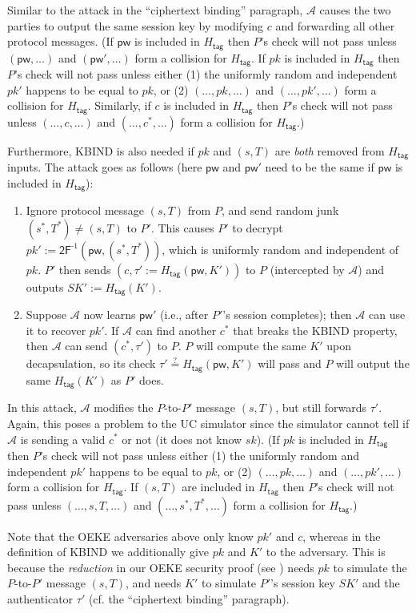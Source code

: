 \documentclass{article}
\theoremstyle{plain}
\theoremstyle{definition}
\theoremstyle{remark}
\newcommand{\adv}{\mathcal{A}}
\newcommand{\Htag}{H_\mathsf{tag}}
\newcommand{\pw}{\mathsf{pw}}
\begin{document}
Similar to the attack in the ``ciphertext binding'' paragraph, $\adv$ causes the two parties to output the same session key by modifying $c$ and forwarding all other protocol messages. (If $\pw$ is included in $\Htag$ then $P$'s check will not pass unless $(\pw, \dots)$ and $(\pw', \dots)$ form a collision for $\Htag$. If $pk$ is included in $\Htag$ then $P$'s check will not pass unless either (1) the uniformly random and independent $pk'$ happens to be equal to $pk$, or (2) $(\dots, pk, \dots)$ and $(\dots, pk', \dots)$ form a collision for $\Htag$. Similarly, if $c$ is included in $\Htag$ then $P$'s check will not pass unless $(\dots, c, \dots)$ and $(\dots, c^*, \dots)$ form a collision for $\Htag$.)

Furthermore, KBIND is also needed if $pk$ and $(s,T)$ are \emph{both} removed from $\Htag$ inputs. The attack goes as follows (here $\pw$ and $\pw'$ need to be the same if $\pw$ is included in $\Htag$):
\begin{enumerate}
  \item Ignore protocol message $(s,T)$ from $P$, and send random junk $(s^*,T^*) \neq (s,T)$ to $P'$. This causes $P'$ to decrypt $pk' := \mathsf{2F}^{\text{-}1}(\pw,(s^*,T^*))$, which is uniformly random and independent of $pk$. $P'$ then sends $(c,\tau' := \Htag(\pw,K'))$ to $P$ (intercepted by $\adv$) and outputs $SK' := \Htag(K')$.
  \item Suppose $\adv$ now learns $\pw'$ (i.e., after $P'$'s session completes); then $\adv$ can use it to recover $pk'$. If $\adv$ can find another $c^*$ that breaks the KBIND property, then $\adv$ can send $(c^*,\tau')$ to $P$. $P$ will compute the same $K'$ upon decapsulation, so its check $\tau' \stackrel{?}{=} \Htag(\pw,K')$ will pass and $P$ will output the same $\Htag(K')$ as $P'$ does.
\end{enumerate}
In this attack, $\adv$ modifies the $P$-to-$P'$ message $(s,T)$, but still forwards $\tau'$. Again, this poses a problem to the UC simulator since the simulator cannot tell if $\adv$ is sending a valid $c^*$ or not (it does not know $sk$). (If $pk$ is included in $\Htag$ then $P$'s check will not pass unless either (1) the uniformly random and independent $pk'$ happens to be equal to $pk$, or (2) $(\dots, pk, \dots)$ and $(\dots, pk', \dots)$ form a collision for $\Htag$. If $(s,T)$ are included in $\Htag$ then $P$'s check will not pass unless $(\dots, s,T, \dots)$ and $(\dots, s^*,T^*, \dots)$ form a collision for $\Htag$.)

Note that the OEKE adversaries above only know $pk'$ and $c$, whereas in the definition of KBIND we additionally give $pk$ and $K'$ to the adversary. This is because the \emph{reduction} in our OEKE security proof (see ) needs $pk$ to simulate the $P$-to-$P'$ message $(s,T)$, and needs $K'$ to simulate $P'$'s session key $SK'$ and the authenticator $\tau'$ (cf. the ``ciphertext binding'' paragraph).
\end{document}
